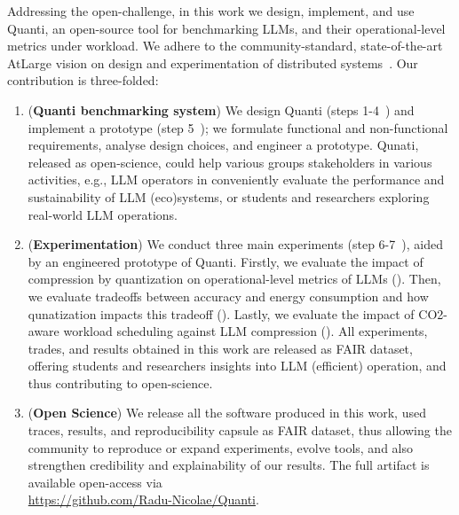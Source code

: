 Addressing the open-challenge, in this work we design, implement, and use Quanti, an open-source tool for benchmarking LLMs, and their operational-level metrics under workload. We adhere to the community-standard, state-of-the-art AtLarge vision on design and experimentation of distributed systems~\cite{iosup2019atlarge}. Our contribution is three-folded:

\begin{enumerate}[label=\textbf{C\arabic*}]
    
    \item \label{introduction:c1} (\textbf{Quanti benchmarking system}) We design Quanti (steps 1-4~\cite{iosup2019atlarge}) and implement a prototype (step 5~\cite{iosup2019atlarge}); we formulate functional and non-functional requirements, analyse design choices, and engineer a prototype. Qunati, released as open-science, could help various groups stakeholders in various activities, e.g., LLM operators in conveniently evaluate the performance and sustainability of LLM (eco)systems, or students and researchers exploring real-world LLM operations.

    \item \label{introduction:c2} (\textbf{Experimentation}) We conduct three main experiments (step 6-7~\cite{iosup2019atlarge}), aided by an engineered prototype of Quanti. Firstly, we evaluate the impact of compression by quantization on operational-level metrics of LLMs (). Then, we evaluate tradeoffs between accuracy and energy consumption and how qunatization impacts this tradeoff (). Lastly, we evaluate the impact of CO2-aware workload scheduling against LLM compression (). All experiments, trades, and results obtained in this work are released as FAIR dataset, offering students and researchers insights into LLM (efficient) operation, and thus contributing to open-science.

    \item \label{introduction:c3} (\textbf{Open Science}) We release all the software produced in this work, used traces, results, and reproducibility capsule as FAIR dataset, thus allowing the community to reproduce or expand experiments, evolve tools, and also strengthen credibility and explainability of our results. The full artifact is available open-access via \\ \url{https://github.com/Radu-Nicolae/Quanti}.

\end{enumerate}


